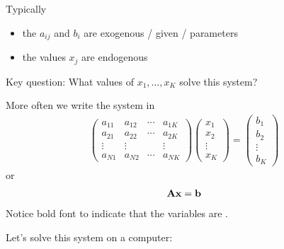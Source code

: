 \documentclass[letterpaper,10pt,english]{jupyterBook}
\begin{document}
\sphinxAtStartPar
Typically
\begin{itemize}
\item {} 
\sphinxAtStartPar
the \(a_{ij}\) and \(b_i\) are exogenous / given / parameters

\item {} 
\sphinxAtStartPar
the values \(x_j\) are endogenous

\end{itemize}

\sphinxAtStartPar
Key question: What values of \(x_1, \ldots, x_K\) solve this system?

\sphinxAtStartPar
More often we write the system in 
\begin{equation*}
\begin{split}
\left(
\begin{array}{cccc}
a_{11} & a_{12} & \cdots & a_{1K} \\
a_{21} & a_{22} & \cdots & a_{2K} \\
\vdots & \vdots & & \vdots \\
a_{N1} & a_{N2} & \cdots & a_{NK} 
\end{array}
\right)
\left(
\begin{array}{c}
x_1 \\
x_2 \\
\vdots \\
x_K
\end{array}
\right)
=
\left(
\begin{array}{c}
b_1 \\
b_2 \\
\vdots \\
b_K
\end{array}
\right)
%
\end{split}
\end{equation*}
\sphinxAtStartPar
or
\begin{equation*}
\begin{split}
%
{\bf A} {\bf x} = {\bf b}
%
\end{split}
\end{equation*}
\sphinxAtStartPar
Notice bold font to indicate that the variables are .

\sphinxAtStartPar
Let’s solve this system on a computer:
\end{document}
